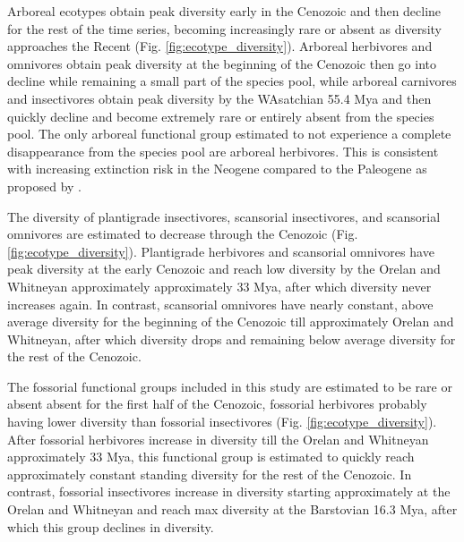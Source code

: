 \documentclass[12pt,letterpaper]{article}
\begin{document}
Arboreal ecotypes obtain peak diversity early in the Cenozoic and then decline for the rest of the time series, becoming increasingly rare or absent as diversity approaches the Recent (Fig. \ref{fig:ecotype_diversity}). Arboreal herbivores and omnivores obtain peak diversity at the beginning of the Cenozoic then go into decline while remaining a small part of the species pool, while arboreal carnivores and insectivores obtain peak diversity by the WAsatchian 55.4 Mya and then quickly decline and become extremely rare or entirely absent from the species pool. The only arboreal functional group estimated to not experience a complete disappearance from the species pool are arboreal herbivores. This is consistent with increasing extinction risk in the Neogene compared to the Paleogene as proposed by \citet{Smits2015b}.




The diversity of plantigrade insectivores, scansorial insectivores, and scansorial omnivores are estimated to decrease through the Cenozoic (Fig. \ref{fig:ecotype_diversity}). Plantigrade herbivores and scansorial omnivores have peak diversity at the early Cenozoic and reach low diversity by the Orelan and Whitneyan approximately approximately 33 Mya, after which diversity never increases again. In contrast, scansorial omnivores have nearly constant, above average diversity for the beginning of the Cenozoic till approximately Orelan and Whitneyan, after which diversity drops and remaining below average diversity for the rest of the Cenozoic.

The fossorial functional groups included in this study are estimated to be rare or absent absent for the first half of the Cenozoic, fossorial herbivores probably having lower diversity than fossorial insectivores (Fig. \ref{fig:ecotype_diversity}). After fossorial herbivores increase in diversity till the Orelan and Whitneyan approximately 33 Mya, this functional group is estimated to quickly reach approximately constant standing diversity for the rest of the Cenozoic. In contrast, fossorial insectivores increase in diversity starting approximately at the Orelan and Whitneyan and reach max diversity at the Barstovian 16.3 Mya, after which this group declines in diversity.
\end{document}
